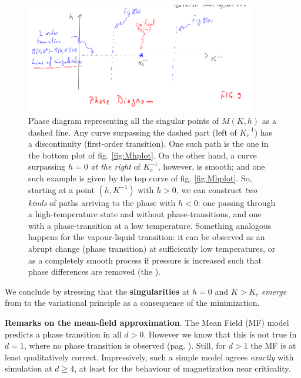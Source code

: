 \documentclass[../../main.tex]{subfiles}
\begin{document}
\begin{figure}[H]
    \centering
    \includegraphics[width=0.9\textwidth]{phase-diagram-uniform.png}
    \caption{Phase diagram representing all the singular points of $M(K,h)$ as a dashed line. Any curve surpassing the dashed part (left of $K_c^{-1}$) has a discontinuity (first-order transition). One such path is the one in the bottom plot of fig. \ref{fig:Mhplot}. On the other hand, a curve surpassing $h=0$ \textit{at the right} of $K_c^{-1}$, however, is smooth; and one such example is given by the top curve of fig. \ref{fig:Mhplot}. So, starting at a point $(h, K^{-1})$ with $h>0$, we can construct \textit{two kinds} of paths arriving to the phase with $h < 0$: one passing through a high-temperature state and without phase-transitions, and one with a phase-transition at a low temperature.
    Something analogous happens for the vapour-liquid transition: it can be observed as an abrupt change (phase transition) at sufficiently low temperatures, or as a completely smooth process if pressure is increased such that phase differences are removed (the ).}
    \label{fig:phase-diagram-uniform}
\end{figure}

We conclude by stressing that the \textbf{singularities} at $h=0$ and $K > K_c$ \textit{emerge} from to the variational principle as a consequence of the minimization.  

\begin{appr}\textbf{Remarks on the mean-field approximation}. The Mean Field (MF) model predicts a phase transition in all $d > 0$. However we know that this is not true in $d=1$, where no phase transition is observed (pag. \pageref{par:no-phase-transition}). Still, for $d > 1$ the MF is at least qualitatively correct. Impressively, such a simple model agrees \textit{exactly} with simulation at $d \geq 4$, at least for the behaviour of magnetization near criticality. 
\end{appr}
\end{document}
